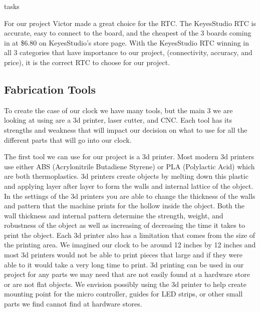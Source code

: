 tasks\documentclass[onecolumn, draftclsnofoot,10pt, compsoc]{IEEEtran}
\begin{document}
For our project Victor made a great choice for the RTC.
The KeyesStudio RTC is accurate, easy to connect to the board, and the cheapest of the 3 boards coming in at \$6.80 on KeyesStudio’s store page.
With the KeyesStudio RTC winning in all 3 categories that have importance to our project, (connectivity, accuracy, and price), it is the correct RTC to choose for our project.

\subsection{Fabrication Tools}
To create the case of our clock we have many tools, but the main 3 we are looking at using are a 3d printer, laser cutter, and CNC.
Each tool has its strengths and weakness that will impact our decision on what to use for all the different parts that will go into our clock.

The first tool we can use for our project is a 3d printer.
Most modern 3d printers use either ABS (Acrylonitrile Butadiene Styrene) or PLA (Polylactic Acid) which are both thermoplastics.
3d printers create objects by melting down this plastic and applying layer after layer to form the walls and internal lattice of the object.
In the settings of the 3d printers you are able to change the thickness of the walls and pattern that the machine prints for the hollow inside the object.
Both the wall thickness and internal pattern determine the strength, weight, and robustness of the object as well as increasing of decreasing the time it takes to print the object. Each 3d printer also has a limitation that comes from the size of the printing area.
We imagined our clock to be around 12 inches by 12 inches and most 3d printers would not be able to print pieces that large and if they were able to it would take a very long time to print.
3d printing can be used in our project for any parts we may need that are not easily found at a hardware store or are not flat objects.
We envision possibly using the 3d printer to help create mounting point for the micro controller, guides for LED strips, or other small parts we find cannot find at hardware stores.
\end{document}
